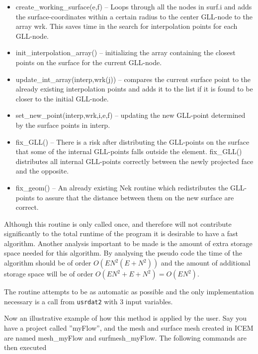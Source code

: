 \begin{itemize}
    \item create\_working\_surface(e,f) -- Loops through all the nodes in surf.i and adds the 
        surface-coordinates within a certain radius to the center GLL-node to the array wrk.
        This saves time in the search for interpolation points for each GLL-node.
    \item init\_interpolation\_array() -- initializing the array containing the closest 
        points on the surface for the current GLL-node. 
    \item update\_int\_array(interp,wrk(j)) -- compares the current surface point to the 
        already existing interpolation points and adds it to the list if it is found to 
        be closer to the initial GLL-node.
    \item set\_new\_point(interp,wrk,i,e,f) -- updating the new GLL-point determined by the 
        surface points in interp.
    \item fix\_GLL() -- There is a risk after distributing the GLL-points on the surface that
        some of the internal GLL-points falls outside the element. fix\_GLL() distributes 
        all internal GLL-points correctly between the newly projected face and the opposite.
    \item fix\_geom() -- An already existing Nek routine which redistributes the GLL-points to 
        assure that the distance between them on the new surface are correct.
\end{itemize}

Although this routine is only called once, and therefore will not contribute significantly 
to the total runtime of the program it is desirable to have a fast algorithm. Another analysis
important to be made is the amount of extra storage space needed for this algorithm.
By analysing the pseudo code the time of the algorithm should be of order $O(EN^2(E+N^2))$
and the amount of additional storage space will be of order $O(EN^2+E+N^2)=O(EN^2)$.

The routine attempts to be as automatic as possible and the only implementation necessary is 
a call from \verb|usrdat2| with 3 input variables.

Now an illustrative example of how this method is applied by the user. Say you have a project
called ''myFlow'', and the mesh and surface mesh created in ICEM are named mesh\_myFlow and 
surfmesh\_myFlow. The following commands are then executed

%

